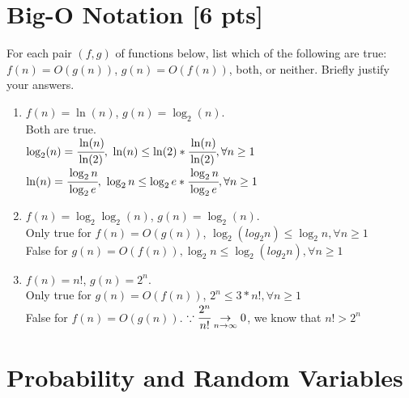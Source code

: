 \documentclass[a4paper]{article}
\theoremstyle{definition}
\newenvironment{soln}{
	\leavevmode\color{blue}\ignorespaces
}{}
\begin{document}
	\section{Big-O Notation [6 pts]}
	For each pair $(f, g)$ of functions below, list which of the following
	are true: $f(n) = O(g(n))$, $g(n) = O(f(n))$, both, or
	neither. Briefly justify your answers.
	\begin{enumerate}
		\item 	$f(n) = \ln(n)$, $g(n) = \log_{2}(n)$.\\
		\begin{soln}  Both are true. \\ $ \log_{2}(n) = \cfrac{\ln(n)}{\ln(2)}, $ $ \ln(n) \leq \ln(2)*\cfrac{\ln(n)}{\ln(2)}, \forall n \geq 1 $ \\ $ \ln(n) = \cfrac{\log_{2}n}{\log_{2}e}, $ $ \log_{2}n \leq \log_{2}e * \cfrac{\log_{2}n}{\log_{2}e}, \forall n \geq 1 $ \end{soln}
		
		\item 	$f(n) =  \log_{2}\log_{2}(n)$, $g(n) = \log_{2}(n)$.\\
		\begin{soln}  Only true for $ f(n) = O(g(n)) $, $ \log_{2}(log_{2}n) \leq \log_{2}n, \forall n \geq 1 $ \\ False for $ g(n) = O(f(n)), \log_{2}n \leq \log_{2}(log_{2}n), \forall n \geq 1 $ \end{soln}
		
		\item 	$f(n) = n!$, $g(n) = 2^n$.\\
		\begin{soln} Only true for $ g(n) = O(f(n)) $, $ 2^{n} \leq 3*n!, \forall n \geq 1 $ \\ False for $ f(n) = O(g(n)) $. $ \because \cfrac{2^n}{n!} \underset{n \rightarrow \infty}{\rightarrow} 0 $, we know that $ n! > 2^n $ \end{soln}
	\end{enumerate}
	
	
	
	
	
	\section{Probability and Random Variables }
\end{document}
